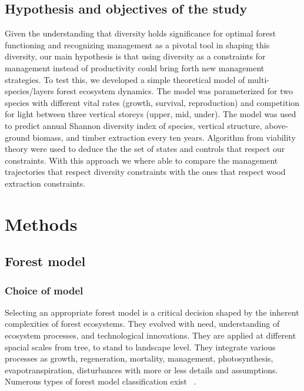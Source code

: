 \documentclass{article}
\begin{document}
\subsection{Hypothesis and objectives of the study}

Given the understanding that diversity holds significance for optimal forest functioning and recognizing management as a pivotal tool in shaping this diversity, our main hypothesis is that using diversity as a constraints for management instead of productivity could bring forth new management strategies. To test this, we developed a simple theoretical model of multi-species/layers forest ecosystem dynamics. The model was parameterized for two species with different vital rates (growth, survival, reproduction) and competition for light between three vertical storeys (upper, mid, under). The model was used to predict annual Shannon diversity index of species, vertical structure, above-ground biomass, and timber extraction every ten years.  Algorithm from viability theory were used to deduce the the set of states and controls that respect our constraints. With this approach we where able to compare the management trajectories that respect diversity constraints with the ones that respect wood extraction constraints. 

\section{Methods}

\subsection{Forest model}
 
\subsubsection{Choice of model}

Selecting an appropriate forest model is a critical decision shaped by the inherent complexities of forest ecosystems. They evolved with need, understanding of ecosystem processes, and technological innovations. They are applied at different spacial scales from tree, to stand to landscape level. They integrate various processes as growth, regeneration, mortality, management, photosynthesis, evapotranspiration, disturbances with more or less details and assumptions. Numerous types of forest model classification exist ~\autocite{porteModellingMixedForest2002}. 
\end{document}
